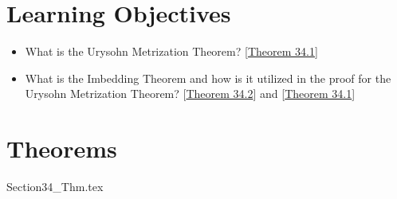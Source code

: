 \section{Learning Objectives}

\begin{itemize}
    \item What is the Urysohn Metrization Theorem?
        [\hyperlink{thm:34.1}{Theorem 34.1}]
    \item What is the Imbedding Theorem and how is it utilized in the proof for the 
        Urysohn Metrization Theorem?
        [\hyperlink{thm:34.2}{Theorem 34.2}] and 
        [\hyperlink{thm:34.1}{Theorem 34.1}]
\end{itemize}

\section{Theorems}

{Section34_Thm.tex}